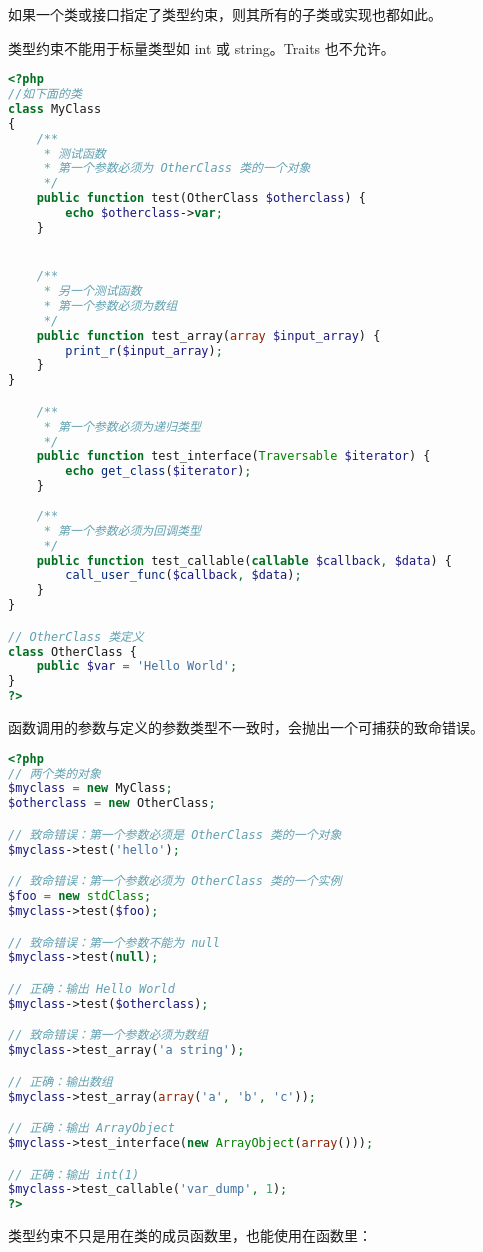 如果一个类或接口指定了类型约束，则其所有的子类或实现也都如此。

类型约束不能用于标量类型如 int 或 string。Traits 也不允许。



\begin{lstlisting}[language=PHP]
<?php
//如下面的类
class MyClass
{
    /**
     * 测试函数
     * 第一个参数必须为 OtherClass 类的一个对象
     */
    public function test(OtherClass $otherclass) {
        echo $otherclass->var;
    }


    /**
     * 另一个测试函数
     * 第一个参数必须为数组 
     */
    public function test_array(array $input_array) {
        print_r($input_array);
    }
}

    /**
     * 第一个参数必须为递归类型
     */
    public function test_interface(Traversable $iterator) {
        echo get_class($iterator);
    }
    
    /**
     * 第一个参数必须为回调类型
     */
    public function test_callable(callable $callback, $data) {
        call_user_func($callback, $data);
    }
}

// OtherClass 类定义
class OtherClass {
    public $var = 'Hello World';
}
?>
\end{lstlisting}

函数调用的参数与定义的参数类型不一致时，会抛出一个可捕获的致命错误。

\begin{lstlisting}[language=PHP]
<?php
// 两个类的对象
$myclass = new MyClass;
$otherclass = new OtherClass;

// 致命错误：第一个参数必须是 OtherClass 类的一个对象
$myclass->test('hello');

// 致命错误：第一个参数必须为 OtherClass 类的一个实例
$foo = new stdClass;
$myclass->test($foo);

// 致命错误：第一个参数不能为 null
$myclass->test(null);

// 正确：输出 Hello World 
$myclass->test($otherclass);

// 致命错误：第一个参数必须为数组
$myclass->test_array('a string');

// 正确：输出数组
$myclass->test_array(array('a', 'b', 'c'));

// 正确：输出 ArrayObject
$myclass->test_interface(new ArrayObject(array()));

// 正确：输出 int(1)
$myclass->test_callable('var_dump', 1);
?>
\end{lstlisting}

类型约束不只是用在类的成员函数里，也能使用在函数里：


